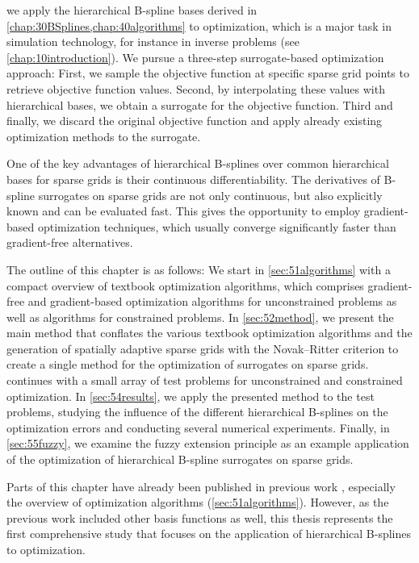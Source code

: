
\label{chap:50optimization}

we apply the hierarchical B-spline bases derived in
\cref{chap:30BSplines,chap:40algorithms} to optimization,
which is a major task in simulation technology,
for instance in inverse problems (see \cref{chap:10introduction}).
We pursue a three-step surrogate-based optimization approach:
First, we sample the objective function at specific sparse grid points
to retrieve objective function values.
Second, by interpolating these values with hierarchical bases,
we obtain a surrogate for the objective function.
Third and finally, we discard the original objective function and apply
already existing optimization methods to the surrogate.

One of the key advantages of hierarchical B-splines
over common hierarchical bases for
sparse grids is their continuous differentiability.
The derivatives of B-spline surrogates on sparse grids are not only continuous,
but also explicitly known and can be evaluated fast.
This gives the opportunity to employ gradient-based optimization techniques,
which usually converge significantly faster than gradient-free alternatives.

The outline of this chapter is as follows:
We start in \cref{sec:51algorithms}
with a compact overview of textbook optimization algorithms,
which comprises gradient-free and gradient-based optimization algorithms
for unconstrained problems as well as algorithms for constrained problems.
In \cref{sec:52method}, we present the main method that
conflates the various textbook optimization algorithms and
the generation of spatially adaptive sparse grids with the
Novak--Ritter criterion to create a single method for the
optimization of surrogates on sparse grids.
 continues with a small array of test problems
for unconstrained and constrained optimization.
In \cref{sec:54results}, we apply the presented method
to the test problems, studying the influence of the different
hierarchical B-splines on the optimization errors and conducting several
numerical experiments.
Finally, in \cref{sec:55fuzzy}, we examine the fuzzy extension principle
as an example application of the optimization of
hierarchical B-spline surrogates on sparse grids.

Parts of this chapter have already been published in previous work
\cite{Valentin14Hierarchische}, especially
the overview of optimization algorithms (\cref{sec:51algorithms}).
However, as the previous work included other basis functions as well,
this thesis represents the first comprehensive study
that focuses on the application of hierarchical B-splines to optimization.







\cleardoublepage
